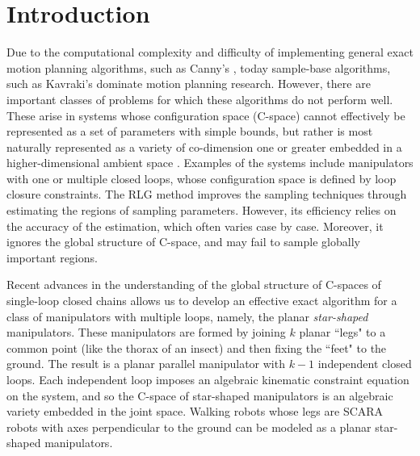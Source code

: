 \documentclass[twocolumn]{IEEEtran}
\begin{document}
\section{Introduction}
Due to the computational complexity and difficulty of implementing
general exact motion planning algorithms, such as Canny's
\cite{Can88}, today sample-base algorithms, such as Kavraki's
\cite{KSLO96} dominate motion planning research. However, there are
important classes of problems for which these algorithms do not
perform well. These arise in systems whose configuration space
(C-space) cannot effectively be represented as a set of parameters
with simple bounds, but rather is most naturally represented as a
variety of co-dimension one or greater embedded in a
higher-dimensional ambient space \cite{YLK01}. Examples of the
systems include manipulators with one or multiple closed loops,
whose configuration space is defined by loop closure constraints.
The RLG method \cite{Cortes02,CS03} improves the sampling techniques
through estimating the regions of sampling parameters. However, its
efficiency relies on the accuracy of the estimation, which often
varies case by case. Moreover, it ignores the global structure of
C-space, and may fail to sample globally important regions.


Recent advances in the understanding of the global structure of
C-spaces of single-loop closed chains \cite{TM02,LTrss05} allows us
to develop an effective exact algorithm for a class of manipulators
with multiple loops, namely, the planar {\sl star-shaped}
manipulators. These manipulators are formed by joining $k$ planar
``legs" to a common point (like the thorax of an insect) and then
fixing the ``feet" to the ground.  The result is a planar parallel
manipulator with $k-1$ independent closed loops. Each independent
loop imposes an algebraic kinematic constraint equation on the
system, and so the C-space of star-shaped manipulators is an
algebraic variety embedded in the joint space. Walking robots whose
legs are SCARA robots with axes perpendicular to the ground can be
modeled as a planar star-shaped manipulators.
\end{document}
